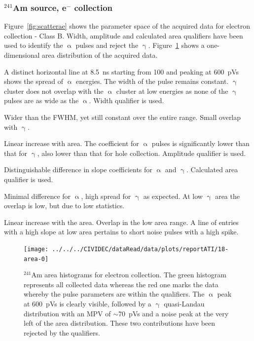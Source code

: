 \subsubsection{$^{241}$Am source, e$^-$ collection}
Figure~\ref{fig:scatterae} shows the parameter space of the acquired data for electron collection - Class B. Width, amplitude and calculated area qualifiers have been used to identify the $\upalpha$ pulses and reject the $\upgamma$. Figure~\ref{fig:1dalphaareae} shows a one-dimensional area distribution of the acquired data.
\begin{description}
\setlength\itemsep{-0.3em}
\item[Width: ] A distinct horizontal line at 8.5~ns starting from 100 and peaking at 600~pVs shows the spread of $\upalpha$ energies. The width of the pulse remains constant. $\upgamma$ cluster does not overlap with the $\upalpha$ cluster at low energies as none of the $\upgamma$ pulses are as wide as the $\upalpha$. Width qualifier is used.
\item[Base width: ] Wider than the FWHM, yet still constant over the entire range. Small overlap with $\upgamma$.
\item[Amplitude: ] Linear increase with area. The coefficient for $\upalpha$ pulses is significantly lower than that for $\upgamma$, also lower than that for hole collection. Amplitude qualifier is used.
\item[Calculated area: ] Distinguishable difference in slope coefficients for $\upalpha$ and $\upgamma$. Calculated area qualifier is used.
\item[Base width -- width: ] Minimal difference for $\upalpha$, high spread for $\upgamma$ as expected. At low $\upgamma$ area the overlap is low, but due to low statistics.
\item[Slope: ] Linear increase with the area. Overlap in the low area range. A line of entries with a high slope at low area pertains to short noise pulses with a high spike.
\end{description}

\begin{figure}[]
\centering
\texttt{[image: ../../../CIVIDEC/dataRead/data/plots/reportATI/18-area-0]}
\caption{$^{241}$Am area histograms for electron collection. The green histogram represents all collected data whereas the red one marks the data whereby the pulse parameters are within the qualifiers. The $\upalpha$ peak at 600~pVs is clearly visible, followed by a $\upgamma$ quasi-Landau distribution with an MPV of $\sim$70~pVs and a noise peak at the very left of the area distribution. These two contributions have been rejected by the qualifiers.}
\label{fig:1dalphaareae}
\end{figure}




